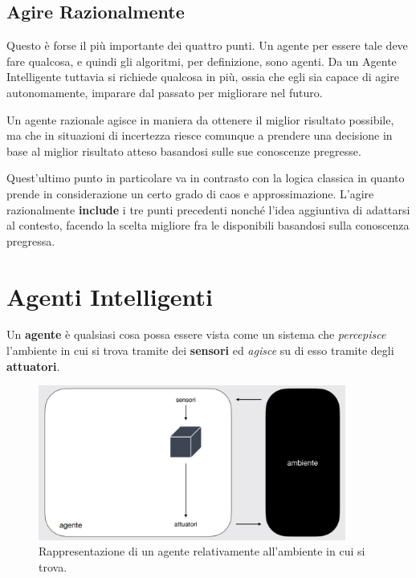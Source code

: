     \subsection{Agire Razionalmente}
        Questo è forse il più importante dei quattro punti. Un agente per essere tale deve fare qualcosa, e quindi gli algoritmi, per definizione, sono agenti. Da un Agente Intelligente tuttavia si richiede qualcosa in più, ossia che egli sia capace di agire autonomamente, imparare dal passato per migliorare nel futuro.
        
        Un agente razionale agisce in maniera da ottenere il miglior risultato possibile, ma che in situazioni di incertezza riesce comunque a prendere una decisione in base al miglior risultato atteso basandosi sulle sue conoscenze pregresse.
        
        Quest'ultimo punto in particolare va in contrasto con la logica classica in quanto prende in considerazione un certo grado di caos e approssimazione. L'agire razionalmente \textbf{include} i tre punti precedenti nonché l'idea aggiuntiva di adattarsi al contesto, facendo la scelta migliore fra le disponibili basandosi sulla conoscenza pregressa.
        
\section{Agenti Intelligenti}
    Un \textbf{agente} è qualsiasi cosa possa essere vista come un sistema che \textit{percepisce} l'ambiente in cui si trova tramite dei \textbf{sensori} ed \textit{agisce} su di esso tramite degli \textbf{attuatori}.
    
    \begin{figure}[h]
        \centering
        \includegraphics[width=0.90\textwidth]{img/img1.png}
        \caption{Rappresentazione di un agente relativamente all'ambiente in cui si trova.}
        \label{fig:un_agente}
    \end{figure}
    
